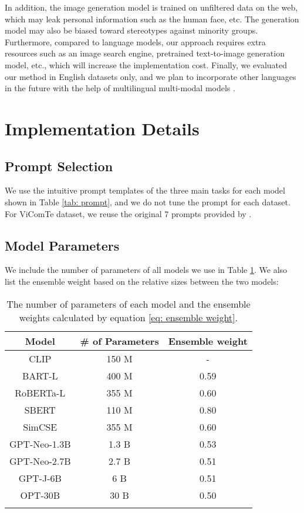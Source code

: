 \documentclass[11pt]{article}
\begin{document}
In addition, the image generation model is trained on unfiltered data on the web, which may leak personal information such as the human face, etc. The generation model may also be biased toward stereotypes against minority groups. Furthermore, compared to language models, our approach requires extra resources such as an image search engine, pretrained text-to-image generation model, etc., which will increase the implementation cost. Finally, we evaluated our method in English datasets only, and we plan to incorporate other languages in the future with the help of multilingual multi-modal models \cite{huang-etal-2021-multilingual}. 



\clearpage

\appendix
\section{Implementation Details}
\subsection{Prompt Selection}
We use the intuitive prompt templates of the three main tasks for each model shown in Table \ref{tab: prompt}, and we do not tune the prompt for each dataset. For ViComTe dataset, we reuse the original 7 prompts provided by \citet{zhang-etal-2022-visual}. 


\subsection{Model Parameters}
We include the number of parameters of all models we use in Table \ref{tab n parameters}. We also list the ensemble weight  based on the relative sizes between the two models:




\begin{table}[!htbp]
\centering
\small
\begin{tabular}{ccc}
\Xhline{3\arrayrulewidth}      
\textbf{Model}        & \textbf{\# of Parameters} & \textbf{Ensemble weight} \\ \hline
CLIP         & 150 M            & -               \\
BART-L       & 400 M            & 0.59            \\
RoBERTa-L    & 355 M            & 0.60            \\
SBERT        & 110 M            & 0.80            \\
SimCSE       & 355 M            & 0.60            \\
GPT-Neo-1.3B & 1.3 B            & 0.53            \\
GPT-Neo-2.7B & 2.7 B            & 0.51            \\
GPT-J-6B     & 6 B              & 0.51            \\
OPT-30B      & 30 B             & 0.50            
\\\Xhline{3\arrayrulewidth}      
\end{tabular}
\caption{The number of parameters of each model and the ensemble weights calculated by equation \ref{eq: ensemble weight}.}
\label{tab n parameters}
\end{table} 
\end{document}
